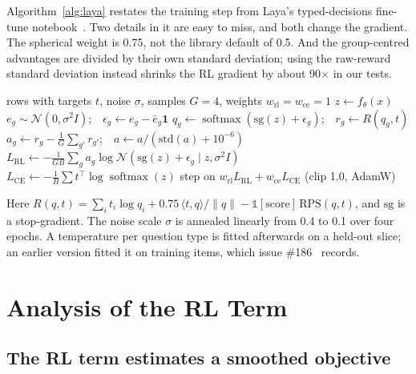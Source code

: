 \documentclass[conference]{IEEEtran}
\DeclareMathOperator{\softmax}{softmax}
\newcommand{\N}{\mathcal{N}}
\begin{document}
Algorithm~\ref{alg:laya} restates the training step from Laya's
typed-decisions fine-tune notebook~\cite{laya_repo}. Two details in it are
easy to miss, and both change the gradient. The spherical weight is 0.75, not
the library default of 0.5. And the group-centred advantages are divided by
their own standard deviation; using the raw-reward standard deviation instead
shrinks the RL gradient by about 90$\times$ in our tests.

\begin{algorithm}[t]
\caption{Laya's RLCD training step (one batch).}
\label{alg:laya}
\begin{algorithmic}[1]
\REQUIRE rows with targets $t$, noise $\sigma$, samples $G{=}4$, weights $w_\mathrm{rl}{=}w_\mathrm{ce}{=}1$
\STATE $z \leftarrow f_\theta(x)$ 
  \STATE $e_g\sim\N(0,\sigma^2 I)$;\ \ $\epsilon_g\leftarrow e_g-\bar e_g\mathbf{1}$ 
  \STATE $q_g\leftarrow\softmax(\mathrm{sg}(z)+\epsilon_g)$;\ \ $r_g\leftarrow R(q_g,t)$
\ENDFOR
\STATE $a_g\leftarrow r_g-\tfrac1G\sum_{g'}r_{g'}$;\ \ $a\leftarrow a/(\mathrm{std}(a)+10^{-6})$
\STATE $L_\mathrm{RL}\leftarrow-\tfrac{1}{GB}\sum_g a_g\log\N(\mathrm{sg}(z)+\epsilon_g\mid z,\sigma^2 I)$
\STATE $L_\mathrm{CE}\leftarrow-\tfrac1B\sum t^\top\log\softmax(z)$
\STATE step on $w_\mathrm{rl}L_\mathrm{RL}+w_\mathrm{ce}L_\mathrm{CE}$ (clip 1.0, AdamW)
\end{algorithmic}
\end{algorithm}

Here $R(q,t)=\sum_i t_i\log q_i+0.75\,\langle t,q\rangle/\|q\|-\mathbb{1}[\text{score}]\,\mathrm{RPS}(q,t)$,
and $\mathrm{sg}$ is a stop-gradient. The noise scale $\sigma$ is annealed
linearly from 0.4 to 0.1 over four epochs. A temperature per question type is
fitted afterwards on a held-out slice; an earlier version fitted it on
training items, which issue \#186~\cite{laya_issue186} records.

\section{Analysis of the RL Term}
\label{sec:analysis}

\subsection{The RL term estimates a smoothed objective}
\end{document}
